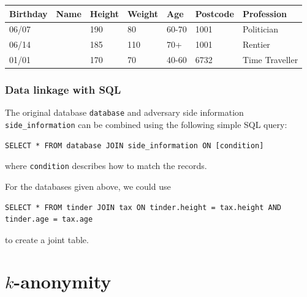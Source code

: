 \begin{frame}
  \begin{example}
    \begin{table}[H]
      \begin{tabular}{l|l|l|l|l|l|l}
        Birthday & Name & Height  & Weight & Age & Postcode & Profession\\
        \hline
        06/07 & & 190 & 80 & 60-70 & 1001 & Politician\\
        06/14 &  & 185 & 110 & 70+ & 1001 & Rentier\\
        01/01 &  & 170 & 70 & 40-60 & 6732 & Time Traveller
      \end{tabular}
    \end{table}
  \end{example}
\end{frame}

\begin{frame}
  \frametitle{Data linkage with SQL}
  
  The original database \verb|database| and adversary side information \verb|side_information| can be combined using the following simple SQL query:
\begin{verbatim}
SELECT * FROM database JOIN side_information ON [condition]
\end{verbatim}
where \verb|condition| describes how to match the records.

  \begin{example}
    For the databases given above, we could use
\begin{verbatim}
SELECT * FROM tinder JOIN tax ON tinder.height = tax.height AND tinder.age = tax.age
\end{verbatim}
    to create a joint table.
  \end{example}
\end{frame}

\section{$k$-anonymity}

